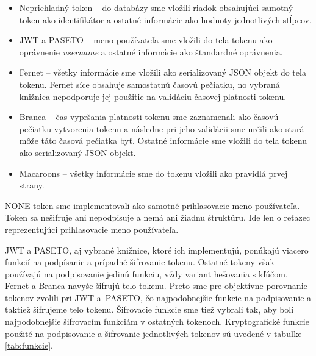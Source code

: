 \begin{itemize}
    \item Nepriehľadný token -- do databázy sme vložili riadok obsahujúci samotný token ako identifikátor a ostatné informácie ako hodnoty jednotlivých stĺpcov.
    \item JWT a PASETO -- meno používateľa sme vložili do tela tokenu ako oprávnenie \textit{username} a ostatné informácie ako štandardné oprávnenia.
    \item Fernet -- všetky informácie sme vložili ako serializovaný JSON objekt do tela tokenu. Fernet síce obsahuje samostatnú časovú pečiatku, no vybraná knižnica nepodporuje jej použitie na validáciu časovej platnosti tokenu.
    \item Branca -- čas vypršania platnosti tokenu sme zaznamenali ako časovú pečiatku vytvorenia tokenu a následne pri jeho validácii sme určili ako stará môže táto časová pečiatka byť. Ostatné informácie sme vložili do tela tokenu ako serializovaný JSON objekt.
    \item Macaroons -- všetky informácie sme do tokenu vložili ako pravidlá prvej strany.
\end{itemize}

NONE token sme implementovali ako samotné prihlasovacie meno používateľa. Token sa nešifruje ani nepodpisuje a nemá ani žiadnu štruktúru. Ide len o reťazec reprezentujúci prihlasovacie meno používateľa.

JWT a PASETO, aj vybrané knižnice, ktoré ich implementujú, ponúkajú viacero funkcií na podpísanie a prípadné šifrovanie tokenu. Ostatné tokeny však používajú na podpisovanie jedinú funkciu, vždy variant hešovania s kľúčom. Fernet a Branca navyše šifrujú telo tokenu. Preto sme pre objektívne porovnanie tokenov zvolili pri JWT a~PASETO, čo najpodobnejšie funkcie na podpisovanie a taktiež šifrujeme telo tokenu. Šifrovacie funkcie sme tiež vybrali tak, aby boli najpodobnejšie šifrovacím funkciám v ostatných tokenoch. Kryptografické funkcie použité na podpisovanie a šifrovanie jednotlivých tokenov sú uvedené v tabuľke \ref{tab:funkcie}.

\begin{table}[H]
  \begin{center}
    \caption{Kryptografické funkcie na podpisovanie a šifrovanie tokenov}
    \label{tab:funkcie} %

  \end{center}
\end{table}

